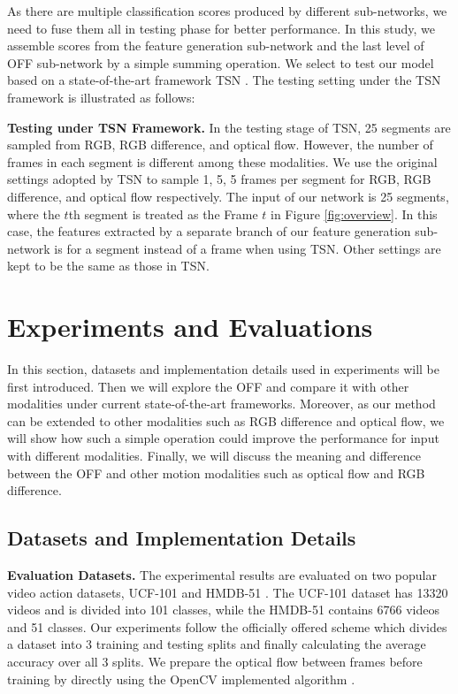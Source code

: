 \documentclass[10pt,twocolumn,letterpaper]{article}
\begin{document}
As there are multiple classification scores produced by different sub-networks, we need to fuse them all in testing phase for better performance. In this study, we  assemble scores from the feature generation sub-network and the last level of OFF sub-network by a simple summing operation. We select to test our model based on a state-of-the-art framework TSN \cite{wang2016tsn}. The testing setting under the TSN framework is illustrated as follows:





\textbf{Testing under TSN Framework.} 
In the testing stage of TSN, 25 segments are sampled from RGB, RGB difference, and optical flow. However, the number of frames in each segment is different among these modalities. We use the original settings adopted by TSN  to sample 1, 5, 5 frames per segment for RGB, RGB difference, and optical flow respectively. The input of our network is 25 segments, where the $t$th segment is treated as the Frame $t$ in Figure \ref{fig:overview}. In this case, the features extracted by a separate branch of our feature generation sub-network is for a segment instead of a frame when using TSN. Other settings are kept to be the same as those in TSN.

\vspace{-5px}
\section{Experiments and Evaluations}
\label{sec:experiment}
In this section, datasets and implementation details used in experiments will be first introduced. Then we will explore the OFF and compare it with other modalities under current state-of-the-art frameworks. Moreover, as our method can be extended to other modalities such as RGB difference and optical flow, we will show how such a simple operation could improve the performance for input with different modalities. Finally, we will discuss the meaning and difference between the OFF and other motion modalities such as optical flow and RGB difference.

\subsection{Datasets and Implementation Details}
\textbf{Evaluation Datasets.} The experimental results are evaluated on two popular video action datasets, UCF-101 \cite{khu2012ucf101} and HMDB-51 \cite{Kuehne11hmdb}. The UCF-101 dataset has 13320 videos and is divided into 101 classes, while the HMDB-51 contains 6766 videos and 51 classes. Our experiments follow the officially offered scheme which divides a dataset into 3 training and testing splits and finally calculating the average accuracy over all 3 splits. We prepare the optical flow between frames before training by directly using the OpenCV implemented algorithm \cite{zach2007tvl1}.
\end{document}
